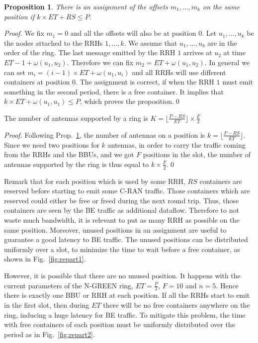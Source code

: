 \documentclass[]{llncs}
\newtheorem{prop}{Proposition}
\begin{document}
\begin{prop}
\label{prop:assign}
There is an assignment of the offsets $m_1, \dots, m_k$ on the same position if  $k\times ET + RS \leq P$.
\end{prop}
\begin{proof}
 We fix $m_1 = 0$ and all the offsets will also be at position $0$. 
 Let $u_1,\dots,u_k$ be the nodes attached to the RRHs $1,\dots,k$. We assume that $u_1,\dots,u_k$ are in the order of the ring. The last message emitted by the RRH $1$ arrives at $u_2$ at time $ET - 1 + \omega(u_1,u_2)$. Therefore we can fix $m_2 =  ET  + \omega(u_1,u_2)$. In general we can set $m_i = (i-1) \times ET + \omega(u_1,u_i)$ and all RRHs will use different containers at position $0$. The assignment is correct, if when the RRH $1$ must emit something in the second period, there is a free container. It implies that  $k \times ET + \omega(u_1,u_1) \leq P$, which proves the proposition.\qed
\end{proof}

\begin{corollary}
The number of antennas supported by a ring is $K = \lfloor\frac{P- RS}{ET}\rfloor \times \frac{F}{2}$
\end{corollary}
\begin{proof}
Following Prop.~\ref{prop:assign}, the number of antennas on a position is $k = \lfloor\frac{P- RS}{ET}\rfloor $.
Since we need two positions for $k$ antennas, in order to carry the traffic coming from the RRHs and the BBUs, and we got $F$ positions in the slot, the number of antennas supported by the ring is thus equal to $k \times \frac{F}{2}$.\qed
\end{proof}
Remark that for each position which is used by some RRH, $RS$ containers are reserved before starting to emit some C-RAN traffic. Those containers which are reserved could either be free or freed during the next round trip. Thus, those containers are seen by the BE traffic as additional dataflow.
Therefore to not waste much bandwidth, it is relevant to put as many RRH as possible on the same position. Moreover, unused positions in an assignment are useful to guarantee a good latency to BE traffic. The unused positions can be distributed uniformly over a slot, to minimize the time to wait before a free container, as shown in Fig.~\ref{fig:repart1}.  

However, it is possible that there are no unused position. It happens with the current parameters of the N-GREEN ring,
$ET = \frac{P}{2}$, $F = 10$ and $n = 5$. Hence there is exactly one  BBU or RRH at each position. If all the RRHs start to emit in the first slot, then during $ET$ there will be no free containers anywhere on the ring, inducing a huge latency for BE traffic. 
To mitigate this problem, the time with free containers of each position must be uniformly distributed over the period as in Fig.~\ref{fig:repart2}.
\end{document}
